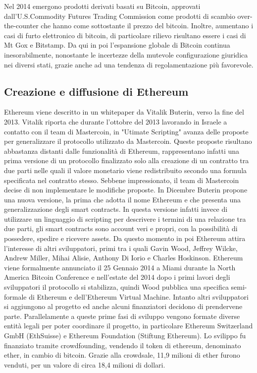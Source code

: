 Nel 2014 emergono prodotti derivati basati su Bitcoin, approvati dall'U.S.Commodity Futures Trading Commission come prodotti di scambio over-the-counter che hanno come sottostante il prezzo del bitcoin. Inoltre, aumentano i casi di furto elettronico di bitcoin, di particolare rilievo risultano essere i casi di Mt Gox e Bitstamp. 
Da qui in poi l'espansione globale di Bitcoin continua inesorabilmente, nonostante le incertezze della mutevole configurazione giuridica nei diversi stati, grazie anche ad una tendenza di regolamentazione più favorevole.  

\subsection{Creazione e diffusione di Ethereum}

Ethereum viene descritto in un whitepaper da Vitalik Buterin, verso la fine del 2013.
Vitalik riporta che durante l'ottobre del 2013 lavorando in Israele a contatto con il team di Mastercoin, in "Utimate Scripting" avanza delle proposte per generalizzare il protocollo utilizzato da Mastercoin. Queste proposte risultano abbastanza distanti dalle funzionalità di Ethereum, rappresentano infatti una prima versione di un protocollo finalizzato solo alla creazione di un contratto tra due parti nelle quali il valore monetario viene redistribuito secondo una formula specificata nel contratto stesso. Sebbene impressionato, il team di Mastercoin decise di non implementare le modifiche proposte. In Dicembre Buterin propone una nuova versione, la prima che adotta il nome Ethereum e che presenta una generalizzazione degli smart contracts. In questa versione infatti invece di utilizzare un linguaggio di scripting per descrivere i termini di una relazione tra due parti, gli smart contracts sono account veri e propri, con la possibilità di possedere, spedire e ricevere assets. Da questo momento in poi Ethereum attira l'interesse di altri sviluppatori, primi tra i quali Gavin Wood, Jeffrey Wilcke, Andrew Miller, Mihai Alisie, Anthony Di Iorio e Charles Hoskinson. 
Ethereum viene formalmente annunciato il 25 Gennaio 2014 a Miami durante la North America Bitcoin Conference  e nell'estate del 2014 dopo i primi lavori degli sviluppatori il protocollo si stabilizza, quindi Wood pubblica una specifica semi-formale di Ethereum e dell'Ethereum Virtual Machine. Intanto altri sviluppatori si aggiungono al progetto ed anche alcuni finanziatori decidono di prendervene parte.
Parallelamente a queste prime fasi di sviluppo vengono formate diverse entità legali per poter coordinare il progetto, in particolare Ethereum Switzerland GmbH (EthSuisse) e Ethereum Foundation (Stiftung Ethereum). Lo svilippo fu finanziato tramite crowdfounding, vendendo il token di ethereum, denominato ether, in cambio di bitcoin. Grazie alla crowdsale, 11,9 milioni di ether furono venduti, per un valore di circa 18,4 milioni di dollari. 

